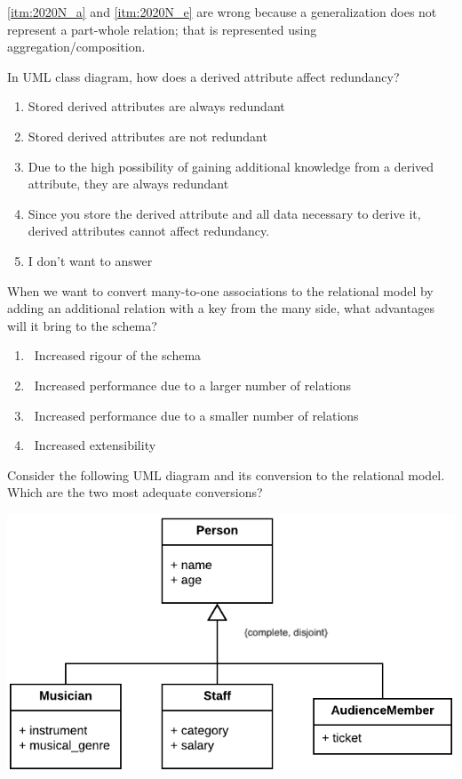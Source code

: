\documentclass{bdad}
\begin{document}
\ansseparator

\ref{itm:2020N_a} and \ref{itm:2020N_e} are wrong because a generalization does not represent a part-whole relation; that is represented using aggregation/composition.

In UML class diagram, how does a derived attribute affect redundancy?

\begin{enumerate}
    \item Stored derived attributes are always redundant \greencheckmark
    \item Stored derived attributes are not redundant
    \item Due to the high possibility of gaining additional knowledge from a derived attribute, they are always redundant
    \item Since you store the derived attribute and all data necessary to derive it, derived attributes cannot affect redundancy.
    \item I don't want to answer
\end{enumerate}

When we want to convert many-to-one associations to the relational model by adding an additional relation with a key from the many side, what advantages will it bring to the schema?

\begin{enumerate}
    \item \boxedgreencheckmark~Increased rigour of the schema
    \item \boxedredcross      ~Increased performance due to a larger number of relations
    \item \boxedredcross      ~Increased performance due to a smaller number of relations
    \item \boxedgreencheckmark~Increased extensibility
\end{enumerate}

\newpage
{}
Consider the following UML diagram and its conversion to the relational model. Which are the two most adequate conversions?

\begin{center}
    \includegraphics[scale=0.3]{2020T-07.png}
\end{center}
\end{document}
